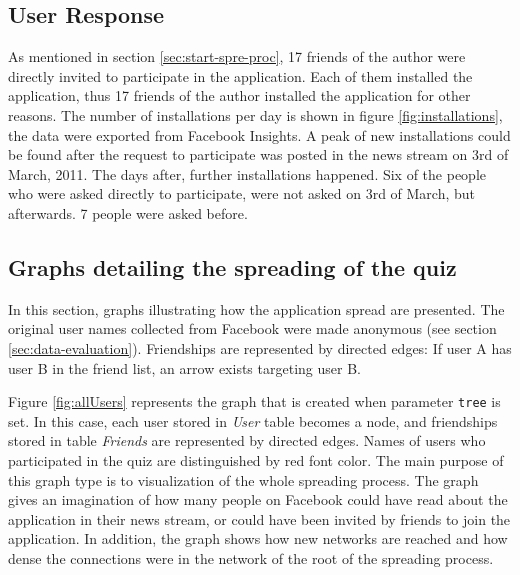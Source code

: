 \documentclass[preprint,12pt]{elsarticle}
\begin{document}
\subsection{User Response}
\label{sec:user-response}
As mentioned in section \ref{sec:start-spre-proc}, 17 friends of the author were
directly invited to participate in the application. Each of them
installed the application, thus 17 friends of the author installed the
application for other reasons. The number of installations per day is
shown in figure \ref{fig:installations}, the data were exported from
Facebook Insights. A peak of new installations could be
found after the request to participate was posted in the news stream
on 3rd of March, 2011. The days after, further installations
happened. Six of the people who were asked directly to participate,
were not asked on 3rd of March, but afterwards. 7 people were asked
before.





\subsection{Graphs detailing the spreading of the quiz}
\label{sec:distribution-quiz}
In this section, graphs illustrating how the
application spread are presented. The original user names collected
from Facebook were made anonymous
 (see section \ref{sec:data-evaluation}). Friendships are
represented by directed edges: If user A has user B in the friend list, an
arrow exists targeting user B.

Figure \ref{fig:allUsers} represents the graph that is created when
parameter \verb|tree| is set. In this case, each user stored in \textit{User}
table becomes a node, and friendships stored in table \textit{Friends}
are represented by directed edges. Names of users who participated in the quiz are distinguished by
red font color. The main purpose of this graph type is to
visualization of the whole spreading process.
The graph gives an imagination of how many 
people on Facebook could have read about the application in their 
news stream, or could have been invited by friends to join the
application. In addition, the graph shows how new networks are
reached and how dense the connections were in the network of the root
of the spreading process.
\end{document}
